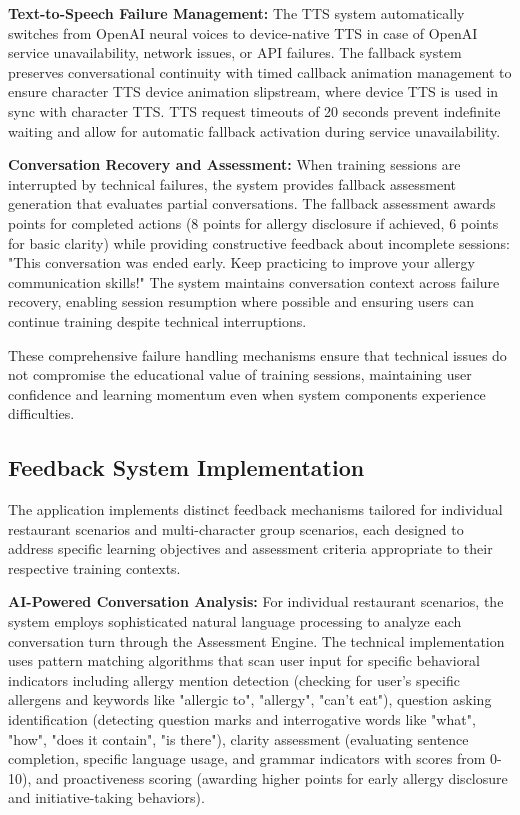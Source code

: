\documentclass[MScCS]{uccthesis}
\begin{document}
\textbf{Text-to-Speech Failure Management:} The TTS system automatically switches from OpenAI neural voices to device-native TTS in case of OpenAI service unavailability, network issues, or API failures. The fallback system preserves conversational continuity with timed callback animation management to ensure character TTS device animation slipstream, where device TTS is used in sync with character TTS. TTS request timeouts of 20 seconds prevent indefinite waiting and allow for automatic fallback activation during service unavailability.

\textbf{Conversation Recovery and Assessment:} When training sessions are interrupted by technical failures, the system provides fallback assessment generation that evaluates partial conversations. The fallback assessment awards points for completed actions (8 points for allergy disclosure if achieved, 6 points for basic clarity) while providing constructive feedback about incomplete sessions: "This conversation was ended early. Keep practicing to improve your allergy communication skills!" The system maintains conversation context across failure recovery, enabling session resumption where possible and ensuring users can continue training despite technical interruptions.

These comprehensive failure handling mechanisms ensure that technical issues do not compromise the educational value of training sessions, maintaining user confidence and learning momentum even when system components experience difficulties.


\subsection{Feedback System Implementation}

The application implements distinct feedback mechanisms tailored for individual restaurant scenarios and multi-character group scenarios, each designed to address specific learning objectives and assessment criteria appropriate to their respective training contexts.

\textbf{AI-Powered Conversation Analysis:} For individual restaurant scenarios, the system employs sophisticated natural language processing to analyze each conversation turn through the Assessment Engine. The technical implementation uses pattern matching algorithms that scan user input for specific behavioral indicators including allergy mention detection (checking for user's specific allergens and keywords like "allergic to", "allergy", "can't eat"), question asking identification (detecting question marks and interrogative words like "what", "how", "does it contain", "is there"), clarity assessment (evaluating sentence completion, specific language usage, and grammar indicators with scores from 0-10), and proactiveness scoring (awarding higher points for early allergy disclosure and initiative-taking behaviors).
\end{document}
